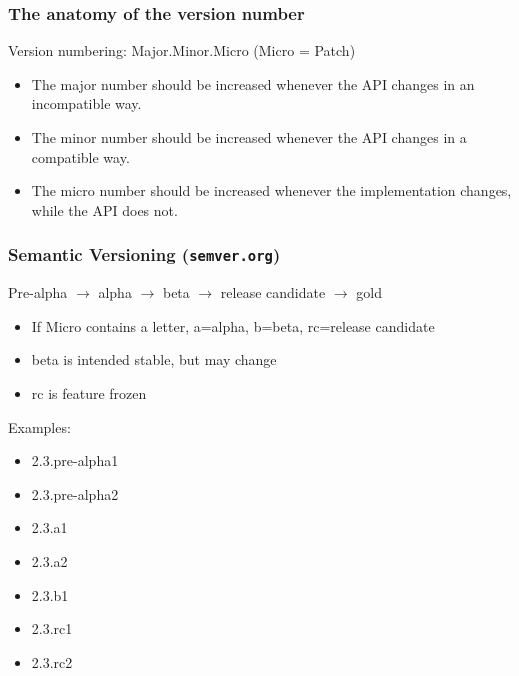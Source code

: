 \documentclass{beamer}
\newcommand{\megaskip}{\bigskip\bigskip\bigskip\bigskip}
\begin{document}
\begin{frame}
  \frametitle{The anatomy of the version number}

  Version numbering:  Major.Minor.Micro (Micro = Patch)

  \megaskip

  \begin{itemize}
  \item The major number should be increased whenever the API changes in an
    incompatible way.\pause
  \item The minor number should be increased whenever the API changes in a
    compatible way.\pause
  \item The micro number should be increased whenever the implementation
    changes, while the API does not.
  \end{itemize}

\end{frame}
\begin{frame}
  \frametitle{Semantic Versioning (\texttt{semver.org})}

  Pre-alpha $\to$ alpha $\to$ beta $\to$ release candidate $\to$ gold

  \pause

  \begin{itemize}
  \item If Micro contains a letter, a=alpha, b=beta, rc=release candidate
  \item beta is intended stable, but may change
  \item rc is feature frozen
  \end{itemize}

  \pause

  Examples:
  \begin{itemize}
  \item 2.3.pre-alpha1
  \item 2.3.pre-alpha2
  \item 2.3.a1
  \item 2.3.a2
  \item 2.3.b1
  \item 2.3.rc1
  \item 2.3.rc2
  \end{itemize}
\end{frame}
\end{document}

